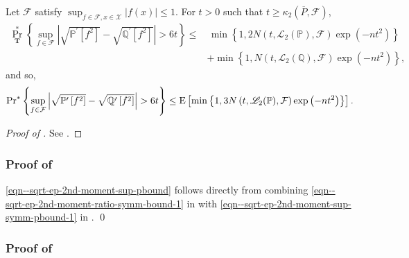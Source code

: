 \begin{lemma}
\label{lem--sqrt-ep-2nd-moment-sup-symm-pbound}
Let \(\mathcal{F}\) satisfy \(\sup_{f \in \mathcal{F}, x \in \mathcal{X}} |f
(x)| \leq 1\).
For \(t > 0\) such that \(t \geq \kappa_{2} \left( \overline{P}, \mathcal{F}
\right)\),
\begin{equation}
  \begin{split}
    \Pr_{\mathbf{T}}^{\ast} \left\{ \sup_{f \in \mathcal{F}} \left|
    \sqrt{\mathbb{P}^{\prime} \left[ f^{2} \right]} - \sqrt{\mathbb{Q}^{\prime}
    \left[ f^{2} \right]} \right| > 6 t \right\} \leq
    & \, \min \left\{ 1, 2 N \left( t, \mathscr{L}_{2} (\mathbb{P}), \mathcal{F}
    \right) \exp \left( - n t^{2} \right) \right\} \\
    & + \min \left\{ 1, N \left( t, \mathscr{L}_{2} (\mathbb{Q}), \mathcal{F}
    \right) \exp \left( - n t^{2} \right) \right\},
  \end{split}
  \label{eqn--sqrt-ep-2nd-moment-sup-symm-pbound-conditional}
\end{equation}
and so,
\begin{equation}
  \mathrm{Pr}^{\ast} \left\{ \sup_{f \in \mathcal{F}} \left|
  \sqrt{\mathbb{P}^{\prime} \left[ f^{2} \right]} - \sqrt{\mathbb{Q}^{\prime}
  \left[ f^{2} \right]} \right| > 6 t \right\} \leq
  \mathrm{E} \left[  \min \left\{ 1, 3 N \left( t, \mathscr{L}_{2} (\mathbb{P}),
  \mathcal{F} \right) \exp \left( - n t^{2} \right) \right\} \right].
  \label{eqn--sqrt-ep-2nd-moment-sup-symm-pbound-1}
\end{equation}
\end{lemma}

\begin{proof}[Proof of ]
See .
\end{proof}

\subsubsection{Proof of
\texorpdfstring{}{Lemma
\ref{lem--sqrt-ep-2nd-moment-sup-pbound}}}

\eqref{eqn--sqrt-ep-2nd-moment-sup-pbound} follows directly from combining
\eqref{eqn--sqrt-ep-2nd-moment-ratio-symm-bound-1} in
 with
\eqref{eqn--sqrt-ep-2nd-moment-sup-symm-pbound-1} in
.
\qed

\subsubsection{Proof of
\texorpdfstring{}{Lemma
\ref{lem--sqrt-ep-2nd-moment-ratio-symm-bound-1}}}
\label{sec--prf--lem--sqrt-ep-2nd-moment-ratio-symm-bound-1}

